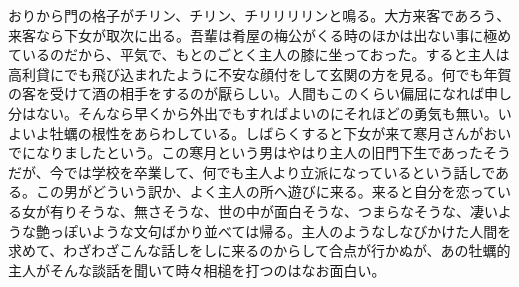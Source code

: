 \documentclass[12pt, openright]{book}
\begin{document}
おりから門の格子がチリン、チリン、チリリリリンと鳴る。大方来客であろう、来客なら下女が取次に出る。吾輩は肴屋の梅公がくる時のほかは出ない事に極めているのだから、平気で、もとのごとく主人の膝に坐っておった。すると主人は高利貸にでも飛び込まれたように不安な顔付をして玄関の方を見る。何でも年賀の客を受けて酒の相手をするのが厭らしい。人間もこのくらい偏屈になれば申し分はない。そんなら早くから外出でもすればよいのにそれほどの勇気も無い。いよいよ牡蠣の根性をあらわしている。しばらくすると下女が来て寒月さんがおいでになりましたという。この寒月という男はやはり主人の旧門下生であったそうだが、今では学校を卒業して、何でも主人より立派になっているという話しである。この男がどういう訳か、よく主人の所へ遊びに来る。来ると自分を恋っている女が有りそうな、無さそうな、世の中が面白そうな、つまらなそうな、凄いような艶っぽいような文句ばかり並べては帰る。主人のようなしなびかけた人間を求めて、わざわざこんな話しをしに来るのからして合点が行かぬが、あの牡蠣的主人がそんな談話を聞いて時々相槌を打つのはなお面白い。
\end{document}
